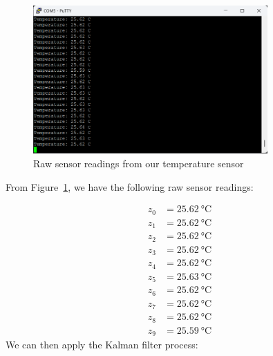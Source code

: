 \documentclass[12pt,a4paper]{article}
\begin{document}
\begin{figure}[h]
    \centering
    \includegraphics[width=0.8\textwidth]{images/raw_sensor_readings.png}
    \caption{Raw sensor readings from our temperature sensor}
    \label{fig:raw-sensor-readings}
\end{figure}

From Figure~\ref{fig:raw-sensor-readings}, we have the following raw sensor readings:

\begin{align}
    z_0 &= \SI{25.62}{\degreeCelsius} \nonumber \\
    z_1 &= \SI{25.62}{\degreeCelsius} \nonumber \\
    z_2 &= \SI{25.62}{\degreeCelsius} \nonumber \\
    z_3 &= \SI{25.62}{\degreeCelsius} \nonumber \\
    z_4 &= \SI{25.62}{\degreeCelsius} \nonumber \\
    z_5 &= \SI{25.63}{\degreeCelsius} \nonumber \\
    z_6 &= \SI{25.62}{\degreeCelsius} \nonumber \\
    z_7 &= \SI{25.62}{\degreeCelsius} \nonumber \\
    z_8 &= \SI{25.62}{\degreeCelsius} \nonumber \\
    z_9 &= \SI{25.59}{\degreeCelsius} \nonumber
\end{align}
We can then apply the Kalman filter process:
\end{document}
